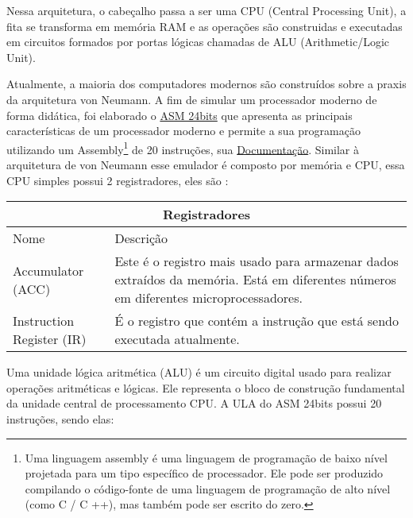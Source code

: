 Nessa arquitetura, o cabeçalho passa a ser uma CPU (Central Processing Unit), a fita se transforma em memória RAM e as operações são construidas e executadas em circuitos formados por portas lógicas  chamadas de ALU (Arithmetic/Logic Unit). \cite{12}

Atualmente, a maioria dos computadores modernos são construídos sobre a praxis da arquitetura von Neumann. A fim de simular um processador moderno de forma didática, foi elaborado o \href{https://gzsig.io/vm-24bits/}{ASM 24bits} que apresenta as principais características de um processador moderno e permite a sua programação utilizando um Assembly\footnote{Uma linguagem assembly é uma linguagem de programação de baixo nível projetada para um tipo específico de processador. Ele pode ser produzido compilando o código-fonte de uma linguagem de programação de alto nível (como C / C ++), mas também pode ser escrito do zero.} de 20 instruções, sua \href{https://github.com/gzsig/Asm/blob/master/README.md}{Documentação}. Similar à arquitetura de von Neumann esse emulador é composto por memória e CPU, essa CPU simples possui 2 registradores, eles são :

\vspace{1cm}
\begin{longtable}{ |p{3cm}||p{11cm}|  }
  \hline
  \multicolumn{2}{|c|}{Registradores} \\
  \hline
    Nome &
    Descrição\\
  \hline
    Accumulator (ACC) &Este é o registro mais usado para armazenar dados extraídos da memória. Está em diferentes números em diferentes microprocessadores.\\
  \hline
    Instruction Register (IR) &É o registro que contém a instrução que está sendo executada atualmente.\\
  \hline
\end{longtable}
\vspace{1cm}

Uma unidade lógica aritmética (ALU) é um circuito digital usado para realizar operações aritméticas e lógicas. Ele representa o bloco de construção fundamental da unidade central de processamento CPU. A ULA do ASM 24bits possui 20 instruções, sendo elas:

